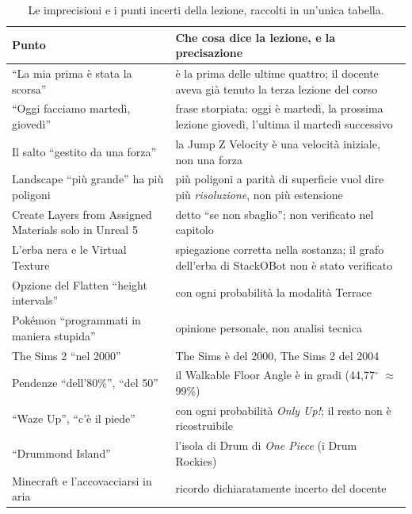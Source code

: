 \begin{table}[htbp]
\centering
\small
\begin{tabular}{@{}p{4.6cm}p{9.4cm}@{}}
\toprule
\textbf{Punto} & \textbf{Che cosa dice la lezione, e la precisazione} \\
\midrule
``La mia prima è stata la scorsa'' & è la prima delle ultime quattro; il docente aveva già
tenuto la terza lezione del corso \\
``Oggi facciamo martedì, giovedì'' & frase storpiata: oggi è martedì, la prossima lezione
giovedì, l'ultima il martedì successivo \\
Il salto ``gestito da una forza'' & la Jump Z Velocity è una velocità iniziale, non una
forza \\
Landscape ``più grande'' ha più poligoni & più poligoni a parità di superficie vuol dire
più \emph{risoluzione}, non più estensione \\
Create Layers from Assigned Materials solo in Unreal 5 & detto ``se non sbaglio''; non
verificato nel capitolo \\
L'erba nera e le Virtual Texture & spiegazione corretta nella sostanza; il grafo dell'erba di
StackOBot non è stato verificato \\
Opzione del Flatten ``height intervals'' & con ogni probabilità la modalità Terrace \\
Pokémon ``programmati in maniera stupida'' & opinione personale, non analisi tecnica \\
The Sims 2 ``nel 2000'' & The Sims è del 2000, The Sims 2 del 2004 \\
Pendenze ``dell'80\%'', ``del 50'' & il Walkable Floor Angle è in gradi (44,77$^\circ$ $\approx$
99\%) \\
``Waze Up'', ``c'è il piede'' & con ogni probabilità \emph{Only Up!}; il resto non è
ricostruibile \\
``Drummond Island'' & l'isola di Drum di \emph{One Piece} (i Drum Rockies) \\
Minecraft e l'accovacciarsi in aria & ricordo dichiaratamente incerto del docente \\
\bottomrule
\end{tabular}
\caption{Le imprecisioni e i punti incerti della lezione, raccolti in un'unica tabella.}
\label{ue14:tab:imprecisioni}
\end{table}


